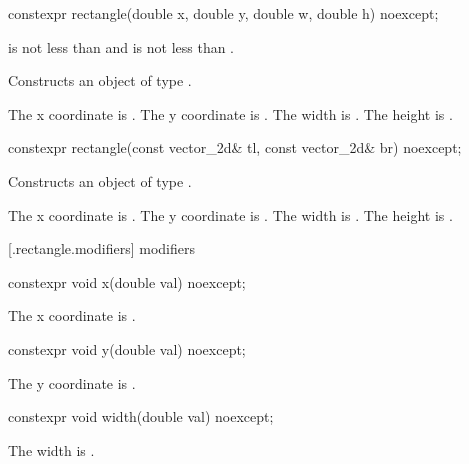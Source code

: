%
\begin{itemdecl}
constexpr rectangle(double x, double y, double w, double h) noexcept;
\end{itemdecl}
\begin{itemdescr}
\pnum
\requires
{} is not less than  and  is not less than .

\pnum
\effects
Constructs an object of type .

\pnum
The x coordinate is . The y coordinate is . The width is . The height is .
\end{itemdescr}

%
\begin{itemdecl}
constexpr rectangle(const vector_2d& tl, const vector_2d& br) noexcept;
\end{itemdecl}
\begin{itemdescr}
\pnum
\effects
Constructs an object of type .

\pnum
The x coordinate is . The y coordinate is . The width is . The height is .
\end{itemdescr}

 [\iotwod.rectangle.modifiers]{ modifiers}

%
\begin{itemdecl}
constexpr void x(double val) noexcept;
\end{itemdecl}

\begin{itemdescr}
\pnum
\effects
The x coordinate is .
\end{itemdescr}

%
\begin{itemdecl}
constexpr void y(double val) noexcept;
\end{itemdecl}
\begin{itemdescr}
\pnum
\effects
The y coordinate is .
\end{itemdescr}

%
\begin{itemdecl}
constexpr void width(double val) noexcept;
\end{itemdecl}
\begin{itemdescr}
\pnum
\effects
The width is .
\end{itemdescr}

